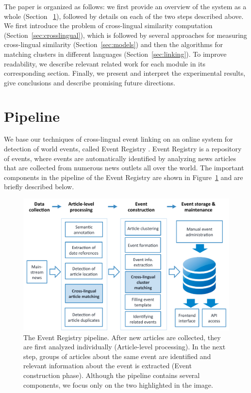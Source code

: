 \documentclass[twoside,11pt]{article}
\begin{document}
The paper is organized as follows: we first provide an overview of the system as a whole (Section ~\ref{sec:pipeline}), followed by details on each of the two steps described above. We first introduce the problem of cross-lingual similarity computation (Section~\ref{sec:crosslingual}), which is followed by several approaches for measuring cross-lingual similarity (Section~\ref{sec:models}) and then the algorithms for matching clusters in different languages (Section~\ref{sec:linking}).  To improve readability, we describe relevant related work for each module in its corresponding section. Finally, we present and interpret the experimental results, give conclusions and describe promising future directions.


\section{Pipeline}\label{sec:pipeline}

We base our techniques of cross-lingual event linking on an online system for detection of world events, called Event Registry . Event Registry is a repository of events, where events are automatically identified by analyzing news articles that are collected from numerous news outlets all over the world. The important components in the pipeline of the Event Registry are shown in Figure~\ref{fig:erpipeline} and are briefly described below.

\begin{figure}[tbp]
\centering
\includegraphics[width=\textwidth]{pipeline}
\caption{\label{fig:erpipeline}  The Event Registry pipeline. After new articles are collected, they are first analyzed individually (Article-level processing). In the next step, groups of articles about the same event are identified and relevant information about the event is extracted (Event construction phase). Although the pipeline contains several components, we focus only on the two highlighted in the image.}
\end{figure}
\end{document}
